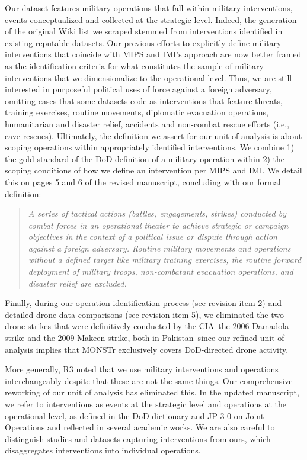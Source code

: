 \documentclass[fleqn,12pt]{article}
\begin{document}
Our dataset features military operations that fall within military interventions, events conceptualized and collected at the strategic level. Indeed, the generation of the original Wiki list we scraped stemmed from interventions identified in existing reputable datasets. Our previous efforts to explicitly define military interventions that coincide with MIPS and IMI's approach are now better framed as the identification criteria for what constitutes the sample of military interventions that we dimensionalize to the operational level. Thus, we are still interested in purposeful political uses of force against a foreign adversary, omitting cases that some datasets code as interventions that feature threats, training exercises, routine movements, diplomatic evacuation operations, humanitarian and disaster relief, accidents and non-combat rescue efforts (i.e., cave rescues). Ultimately, the definition we assert for our unit of analysis is about scoping operations within appropriately identified interventions. We combine 1) the gold standard of the DoD definition of a military operation within 2) the scoping conditions of how we define an intervention per MIPS and IMI. We detail this on pages 5 and 6 of the revised manuscript, concluding with our formal definition:

    \begin{quote}
    \textit{A series of tactical actions (battles, engagements, strikes) conducted by combat forces in an operational theater to achieve strategic or campaign objectives in the context of a political issue or dispute through action against a foreign adversary. Routine military movements and operations without a defined target like military training exercises, the routine forward deployment of military troops, non-combatant evacuation operations, and disaster relief are excluded.}
    \end{quote}

Finally, during our operation identification process (see revision item 2) and detailed drone data comparisons (see revision item 5), we eliminated the two drone strikes that were definitively conducted by the CIA--the 2006 Damadola strike and the 2009 Makeen strike, both in Pakistan--since our refined unit of analysis implies that MONSTr exclusively covers DoD-directed drone activity.

More generally, R3 noted that we use military interventions and operations interchangeably despite that these are not the same things. Our comprehensive reworking of our unit of analysis has eliminated this. In the updated manuscript, we refer to interventions as events at the strategic level and operations at the operational level, as defined in the DoD dictionary and JP 3-0 on Joint Operations and reflected in several academic works. We are also careful to distinguish studies and datasets capturing interventions from ours, which disaggregates interventions into individual operations.
\end{document}
